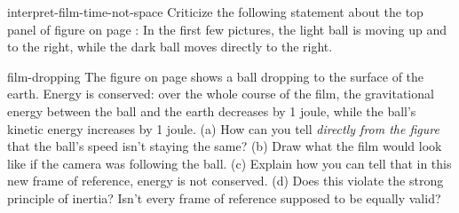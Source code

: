 \begin{hwsection}
\begin{hw}{interpret-film-time-not-space}
Criticize the following statement about the top panel of figure  on page \pageref{fig:possible}:
In the first few pictures, the light ball is moving up and to the right, while the dark ball moves directly to the
right.
\end{hw}


\begin{hw}{film-dropping}
The figure on page \pageref{hw-film-dropping-fig}
shows a ball dropping to the surface of the earth. Energy is conserved: over the
whole course of the film, the gravitational energy between the ball and the earth decreases
by 1 joule, while the ball's kinetic energy increases by 1 joule.\hwendpart
(a) How can you tell \emph{directly from the figure}
 that the ball's speed isn't staying the same?\hwendpart
(b) Draw what the film would look like if the camera was following the ball.\hwendpart
(c) Explain how you can tell that in this new frame of reference, energy is not conserved.\hwendpart
(d) Does this violate the strong principle of inertia? Isn't every frame of reference supposed to be equally valid?
\end{hw}

\label{hw-film-dropping-fig}


\end{hwsection}



